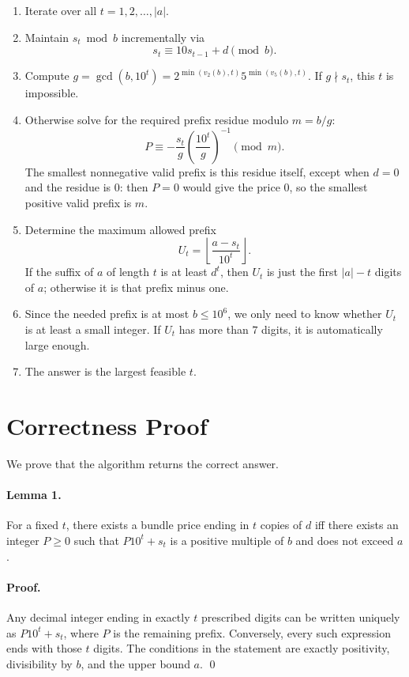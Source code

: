 \documentclass[11pt]{article}
\begin{document}
\begin{enumerate}[leftmargin=*]
    \item Iterate over all $t = 1, 2, \dots, |a|$.
    \item Maintain $s_t \bmod b$ incrementally via
    \[
        s_t \equiv 10 s_{t-1} + d \pmod b.
    \]
    \item Compute $g = \gcd(b,10^t) = 2^{\min(v_2(b),t)}5^{\min(v_5(b),t)}$.
    If $g \nmid s_t$, this $t$ is impossible.
    \item Otherwise solve for the required prefix residue modulo $m=b/g$:
    \[
        P \equiv
        -\frac{s_t}{g}\left(\frac{10^t}{g}\right)^{-1}
        \pmod m.
    \]
    The smallest nonnegative valid prefix is this residue itself, except when $d=0$ and the residue is $0$:
    then $P=0$ would give the price $0$, so the smallest positive valid prefix is $m$.
    \item Determine the maximum allowed prefix
    \[
        U_t = \left\lfloor \frac{a-s_t}{10^t} \right\rfloor.
    \]
    If the suffix of $a$ of length $t$ is at least $d^t$, then $U_t$ is just the first $|a|-t$ digits of $a$;
    otherwise it is that prefix minus one.
    \item Since the needed prefix is at most $b \le 10^6$, we only need to know whether $U_t$ is at least a
    small integer. If $U_t$ has more than $7$ digits, it is automatically large enough.
    \item The answer is the largest feasible $t$.
\end{enumerate}

\section*{Correctness Proof}

We prove that the algorithm returns the correct answer.

\paragraph{Lemma 1.}
For a fixed $t$, there exists a bundle price ending in $t$ copies of $d$ iff there exists an integer
$P \ge 0$ such that $P10^t + s_t$ is a positive multiple of $b$ and does not exceed $a$.

\paragraph{Proof.}
Any decimal integer ending in exactly $t$ prescribed digits can be written uniquely as $P10^t + s_t$,
where $P$ is the remaining prefix. Conversely, every such expression ends with those $t$ digits. The
conditions in the statement are exactly positivity, divisibility by $b$, and the upper bound $a$. \qed
\end{document}
